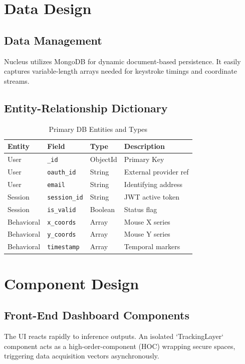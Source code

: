 \documentclass[12pt, a4paper]{article}
\begin{document}
\newpage
\section{Data Design}

\subsection{Data Management}
Nucleus utilizes MongoDB for dynamic document-based persistence. It easily captures variable-length arrays needed for keystroke timings and coordinate streams.

\subsection{Entity-Relationship Dictionary}
\begin{table}[H]
\centering
\begin{tabularx}{\textwidth}{|X|X|X|X|}
\hline
\textbf{Entity} & \textbf{Field} & \textbf{Type} & \textbf{Description} \\
\hline
User & \texttt{\_id} & ObjectId & Primary Key \\
User & \texttt{oauth\_id} & String & External provider ref \\
User & \texttt{email} & String & Identifying address \\
Session & \texttt{session\_id} & String & JWT active token \\
Session & \texttt{is\_valid} & Boolean & Status flag \\
Behavioral & \texttt{x\_coords} & Array & Mouse X series \\
Behavioral & \texttt{y\_coords} & Array & Mouse Y series \\
Behavioral & \texttt{timestamp} & Array & Temporal markers \\
\hline
\end{tabularx}
\caption{Primary DB Entities and Types}
\end{table}

\newpage
\section{Component Design}

\subsection{Front-End Dashboard Components}
The UI reacts rapidly to inference outputs. An isolated `TrackingLayer` component acts as a high-order-component (HOC) wrapping secure spaces, triggering data acquisition vectors asynchronously.
\end{document}
